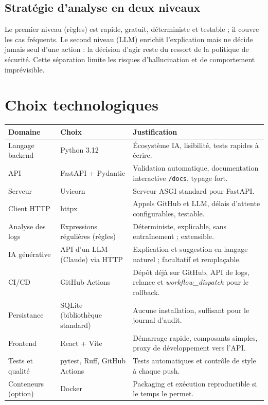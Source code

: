 \documentclass[11pt,a4paper]{article}
\newcommand{\code}[1]{\texttt{#1}}
\begin{document}
\subsection{Stratégie d'analyse en deux niveaux}
Le premier niveau (règles) est rapide, gratuit, déterministe et testable ; il couvre les cas
fréquents. Le second niveau (LLM) enrichit l'explication mais ne décide jamais seul d'une
action : la décision d'agir reste du ressort de la politique de sécurité. Cette séparation
limite les risques d'hallucination et de comportement imprévisible.

\section{Choix technologiques}
\begin{longtable}{p{2.6cm}p{3.6cm}p{8.3cm}}
\toprule
\textbf{Domaine} & \textbf{Choix} & \textbf{Justification} \\
\midrule\endhead
Langage backend & Python 3.12 & Écosystème IA, lisibilité, tests rapides à écrire. \\
API & FastAPI + Pydantic & Validation automatique, documentation interactive \code{/docs}, typage fort. \\
Serveur & Uvicorn & Serveur ASGI standard pour FastAPI. \\
Client HTTP & httpx & Appels GitHub et LLM, délais d'attente configurables, testable. \\
Analyse des logs & Expressions régulières (règles) & Déterministe, explicable, sans entraînement ; extensible. \\
IA générative & API d'un LLM (Claude) via HTTP & Explication et suggestion en langage naturel ; facultatif et remplaçable. \\
CI/CD & GitHub Actions & Dépôt déjà sur GitHub, API de logs, relance et \emph{workflow\_dispatch} pour le rollback. \\
Persistance & SQLite (bibliothèque standard) & Aucune installation, suffisant pour le journal d'audit. \\
Frontend & React + Vite & Démarrage rapide, composants simples, proxy de développement vers l'API. \\
Tests et qualité & pytest, Ruff, GitHub Actions & Tests automatiques et contrôle de style à chaque push. \\
Conteneurs (option) & Docker & Packaging et exécution reproductible si le temps le permet. \\
\bottomrule
\end{longtable}
\end{document}
